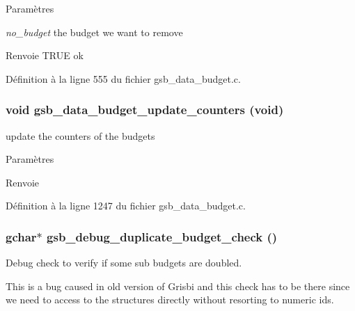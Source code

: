 \begin{DoxyParams}{Paramètres}
\item[{\em no\_\-budget}]the budget we want to remove\end{DoxyParams}
\begin{DoxyReturn}{Renvoie}
TRUE ok 
\end{DoxyReturn}


Définition à la ligne 555 du fichier gsb\_\-data\_\-budget.c.

\subsubsection[{gsb\_\-data\_\-budget\_\-update\_\-counters}]{\setlength{\rightskip}{0pt plus 5cm}void gsb\_\-data\_\-budget\_\-update\_\-counters (void)}\label{gsb__data__budget_8c_a0bbe7a3a70e1a8d1f6b57a311b4341ee}
update the counters of the budgets


\begin{DoxyParams}{Paramètres}
\item[{\em }]\end{DoxyParams}
\begin{DoxyReturn}{Renvoie}

\end{DoxyReturn}


Définition à la ligne 1247 du fichier gsb\_\-data\_\-budget.c.

\subsubsection[{gsb\_\-debug\_\-duplicate\_\-budget\_\-check}]{\setlength{\rightskip}{0pt plus 5cm}gchar$\ast$ gsb\_\-debug\_\-duplicate\_\-budget\_\-check ()}\label{gsb__data__budget_8c_acba891a0cbb4c3504b649cdbfe682816}


Debug check to verify if some sub budgets are doubled. 

This is a bug caused in old version of Grisbi and this check has to be there since we need to access to the structures directly without resorting to numeric ids.

